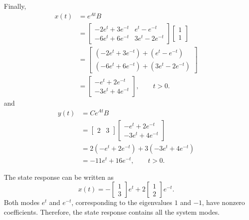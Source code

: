 \documentclass[12pt,a4paper]{article}
\begin{document}
Finally, 
\begin{align*}
 x(t) &= e^{At}B \\
 &= \begin{bmatrix}
	-2e^{t} + 3e^{-t} & e^{t} -e^{-t} \\
-6e^{t} + 6e^{-t} & 3e^{t}-2e^{-t}
 \end{bmatrix}	\begin{bmatrix}
 1 \\ 1
 \end{bmatrix} \\
 &= \begin{bmatrix}
 (-2e^t+3e^{-t})+(e^t-e^{-t}) \\
 (-6e^t+6e^{-t})+(3e^t-2e^{-t})
 \end{bmatrix} \\
 &= \begin{bmatrix}
 -e^t+2e^{-t} \\
 -3e^t+4e^{-t}
 \end{bmatrix}, \qquad t>0.
\end{align*}
and 
\begin{align*}
y(t) &= Ce^{At}B \\
&= \begin{bmatrix}2 & 3\end{bmatrix}
\begin{bmatrix}
-e^t+2e^{-t} \\
-3e^t+4e^{-t}
\end{bmatrix} \\
&= 2(-e^t+2e^{-t})+3(-3e^t+4e^{-t}) \\
&= -11e^t+16e^{-t}, \qquad t>0.
\end{align*}

The state response can be written as
\[
x(t)=-\begin{bmatrix}1\\3\end{bmatrix}e^t
     +2\begin{bmatrix}1\\2\end{bmatrix}e^{-t}.
\]
Both modes $e^t$ and $e^{-t}$, corresponding to the eigenvalues $1$ and $-1$,
have nonzero coefficients. Therefore, the state response contains all the system modes.


\vspace{4cm}
\end{document}
